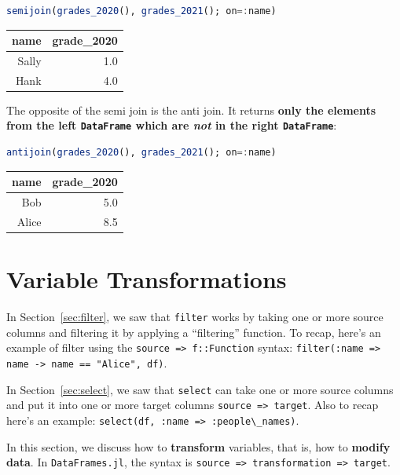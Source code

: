 \documentclass[
  notoc %
]{tufte-book}
\newcommand{\passthrough}[1]{#1}
\begin{document}
\begin{lstlisting}[language=Julia]
semijoin(grades_2020(), grades_2021(); on=:name)
\end{lstlisting}

\begin{longtable}[]{@{}rr@{}}
\toprule
name & grade\_2020 \\
\midrule
\endhead
Sally & 1.0 \\
Hank & 4.0 \\
\bottomrule
\end{longtable}

The opposite of the semi join is the anti join. It returns \textbf{only
the elements from the left \passthrough{\lstinline!DataFrame!} which are
\emph{not} in the right \passthrough{\lstinline!DataFrame!}}:

\begin{lstlisting}[language=Julia]
antijoin(grades_2020(), grades_2021(); on=:name)
\end{lstlisting}

\begin{longtable}[]{@{}rr@{}}
\toprule
name & grade\_2020 \\
\midrule
\endhead
Bob & 5.0 \\
Alice & 8.5 \\
\bottomrule
\end{longtable}

\hypertarget{variable-transformations}{%
\section{Variable Transformations}\label{variable-transformations}}

In Section~\ref{sec:filter}, we saw that
\passthrough{\lstinline!filter!} works by taking one or more source
columns and filtering it by applying a ``filtering'' function. To recap,
here's an example of filter using the
\passthrough{\lstinline!source => f::Function!} syntax:
\passthrough{\lstinline!filter(:name => name -> name == "Alice", df)!}.

In Section~\ref{sec:select}, we saw that
\passthrough{\lstinline!select!} can take one or more source columns and
put it into one or more target columns
\passthrough{\lstinline!source => target!}. Also to recap here's an
example: \passthrough{\lstinline!select(df, :name => :people\_names)!}.

In this section, we discuss how to \textbf{transform} variables, that
is, how to \textbf{modify data}. In
\passthrough{\lstinline!DataFrames.jl!}, the syntax is
\passthrough{\lstinline!source => transformation => target!}.
\end{document}
